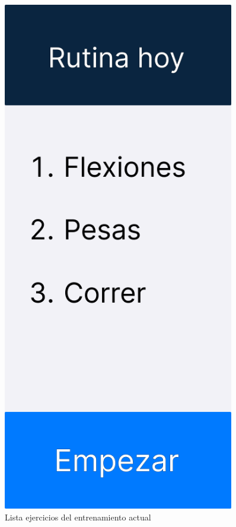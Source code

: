 \begin{figure}[H]
   \centering
   \begin{minipage}{0.45\textwidth}
      \centering
      \includegraphics[width=0.9\textwidth]{fotos/Frame 1.png}
      \caption{Lista ejercicios del entrenamiento actual}

\end{minipage}
\end{figure}
